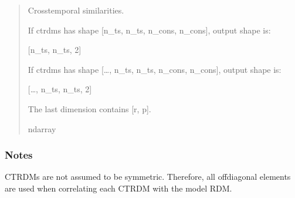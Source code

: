 \documentclass[letterpaper,10pt,english]{sphinxhowto}
\begin{document}
\begin{fulllineitems}
\begin{quote}
\begin{description}
\begin{itemize}
\end{itemize}

\sphinxAtStartPar

\sphinxAtStartPar
{} \textendash{} Cross\sphinxhyphen{}temporal similarities.

\sphinxAtStartPar
If ctrdms has shape {[}n\_ts, n\_ts, n\_cons, n\_cons{]}, output shape is:

\sphinxAtStartPar
{[}n\_ts, n\_ts, 2{]}

\sphinxAtStartPar
If ctrdms has shape {[}…, n\_ts, n\_ts, n\_cons, n\_cons{]}, output shape is:

\sphinxAtStartPar
{[}…, n\_ts, n\_ts, 2{]}

\sphinxAtStartPar
The last dimension contains {[}r, p{]}.


\sphinxAtStartPar
ndarray

\end{description}\end{quote}
\subsubsection*{Notes}

\sphinxAtStartPar
CTRDMs are not assumed to be symmetric. Therefore, all off\sphinxhyphen{}diagonal
elements are used when correlating each CTRDM with the model RDM.

\end{fulllineitems}

\end{document}
